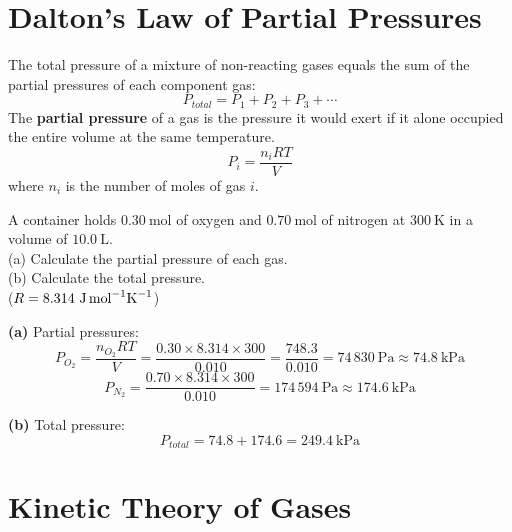 \section{Dalton's Law of Partial Pressures}

\begin{lawbox}
The total pressure of a mixture of non-reacting
gases equals the sum of the partial pressures of
each component gas:
\[
  P_{total} = P_1 + P_2 + P_3 + \cdots
\]
The \textbf{partial pressure} of a gas is the
pressure it would exert if it alone occupied the
entire volume at the same temperature.
\[
  P_i = \frac{n_i RT}{V}
\]
where $n_i$ is the number of moles of gas $i$.
\end{lawbox}

\begin{examplebox}[14.5]
A container holds $0.30\ \text{mol}$ of oxygen and
$0.70\ \text{mol}$ of nitrogen at $300\ \text{K}$
in a volume of $10.0\ \text{L}$.\\
(a) Calculate the partial pressure of each gas.\\
(b) Calculate the total pressure.\\
($R = 8.314\ \text{J\,mol}^{-1}\text{K}^{-1}$)
\end{examplebox}

\begin{solutionbox}
\textbf{(a)} Partial pressures:
\[
  P_{O_2} = \frac{n_{O_2}RT}{V}
  = \frac{0.30 \times 8.314 \times 300}
    {0.010}
  = \frac{748.3}{0.010}
  = 74\,830\ \text{Pa} \approx 74.8\ \text{kPa}
\]
\[
  P_{N_2} = \frac{0.70 \times 8.314 \times 300}
    {0.010}
  = 174\,594\ \text{Pa} \approx 174.6\ \text{kPa}
\]

\textbf{(b)} Total pressure:
\[
  P_{total} = 74.8 + 174.6 = 249.4\ \text{kPa}
\]
\end{solutionbox}

\section{Kinetic Theory of Gases}

